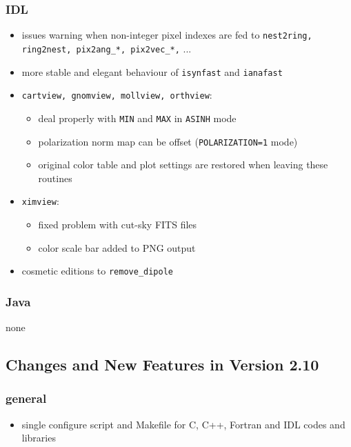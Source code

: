\documentclass[12pt,twoside]{article}
\begin{document}
{{\subsubsection[IDL]{IDL}
	\begin{itemize}
	\item issues warning when non-integer pixel indexes are fed to {\tt nest2ring, ring2nest, pix2ang\_*, pix2vec\_*,}   ...
	\item more stable and elegant behaviour of {\tt isynfast} and {\tt ianafast}
	\item {\tt cartview, gnomview, mollview, orthview}:
		\begin{itemize}
		\item deal properly with {\tt MIN} and {\tt MAX} in {\tt ASINH} mode
		\item polarization norm map can be offset ({\tt POLARIZATION=1} mode)
		\item original color table and plot settings are restored when
leaving these routines
		\end{itemize}
	\item {\tt ximview}:
		\begin{itemize}
		\item fixed problem with cut-sky FITS files
		\item color scale bar added to PNG output
		\end{itemize}
	\item cosmetic editions to {\tt remove\_dipole}
	\end{itemize}

\subsubsection[Java]{Java}
	none

\subsection{Changes and New Features in Version 2.10}
\subsubsection[New General Features]{general}
  \begin{itemize}
    \item single configure script and Makefile for C, C++, Fortran and IDL codes and libraries
  \end{itemize}
}}
\end{document}
